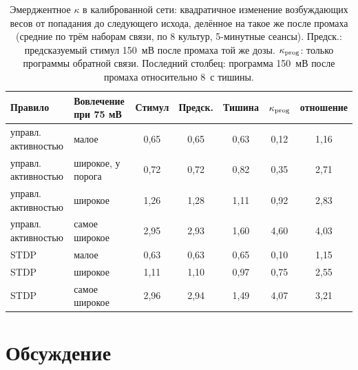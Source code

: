 \documentclass[pre,twocolumn,superscriptaddress,showpacs=false,amsmath,amssymb,nofootinbib]{revtex4-2}
\begin{document}
\begin{table}[t]
\caption{Эмерджентное $\kappa$ в калиброванной сети: квадратичное изменение возбуждающих весов от попадания до следующего исхода, делённое на такое же после промаха (средние по трём наборам связи, по 8 культур, 5-минутные сеансы). Предск.: предсказуемый стимул 150~мВ после промаха той же дозы. $\kappa_{\rm prog}$: только программы обратной связи. Последний столбец: программа 150~мВ после промаха относительно 8~с тишины.}
\label{tab:kappa}
\footnotesize
\begin{ruledtabular}
\begin{tabular}{llccccc}
Правило & Вовлечение при 75 мВ & Стимул & Предск. & Тишина & $\kappa_{\rm prog}$ & отношение \\
\hline
управл. активностью & малое & 0{,}65 & 0{,}65 & 0{,}63 & 0{,}12 & 1{,}16 \\
управл. активностью & широкое, у порога & 0{,}72 & 0{,}72 & 0{,}82 & 0{,}35 & 2{,}71 \\
управл. активностью & широкое & 1{,}26 & 1{,}28 & 1{,}11 & 0{,}92 & 2{,}83 \\
управл. активностью & самое широкое & 2{,}95 & 2{,}93 & 1{,}60 & 4{,}60 & 4{,}03 \\
STDP & малое & 0{,}63 & 0{,}63 & 0{,}65 & 0{,}10 & 1{,}15 \\
STDP & широкое & 1{,}11 & 1{,}10 & 0{,}97 & 0{,}75 & 2{,}55 \\
STDP & самое широкое & 2{,}96 & 2{,}94 & 1{,}49 & 4{,}07 & 3{,}21 \\
\end{tabular}
\end{ruledtabular}
\end{table}

\section{Обсуждение}\label{sec:discussion}
\end{document}
